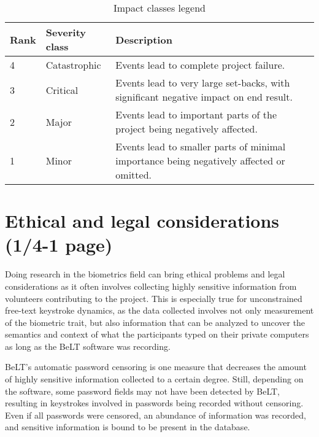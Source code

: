 \documentclass[informationsecurity]{gucmasterproject}
\begin{document}
\begin{table}[H]
\centering
\caption{Impact classes legend}
\label{tab:impact-classes}
\begin{tabular}{ p{2cm} p{3cm} p{8cm}}
\hline \bf Rank & \bf Severity class & \bf Description \\

\hline 4 & Catastrophic & Events lead to complete project failure. \\
3 & Critical & Events lead to very large set-backs, with significant negative impact on end result.\\
2 & Major & Events lead to important parts of the project being negatively affected. \\
1 & Minor & Events lead to smaller parts of minimal importance being negatively affected or omitted.\\
\hline
\end{tabular}
\end{table}





\chapter{Ethical and legal considerations (1/4-1 page)}
Doing research in the biometrics field can bring ethical problems and legal considerations as it often involves collecting highly sensitive information from volunteers contributing to the project.
This is especially true for unconstrained free-text keystroke dynamics, as the data collected involves not only measurement of the biometric trait, but also information that can be analyzed to uncover the semantics and context of what the participants typed on their private computers as long as the BeLT software was recording.

BeLT's automatic password censoring is one measure that decreases the amount of highly sensitive information collected to a certain degree.
Still, depending on the software, some password fields may not have been detected by BeLT, resulting in keystrokes involved in passwords being recorded without censoring. 
Even if all passwords were censored, an abundance of information was recorded, and sensitive information is bound to be present in the database.
\end{document}
